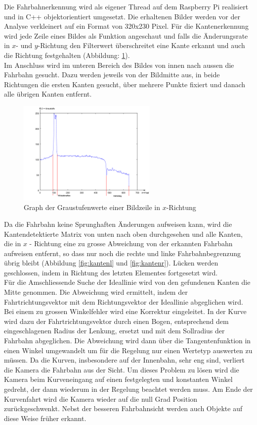 Die Fahrbahnerkennung wird als eigener Thread auf dem Raspberry Pi realisiert und in C++ objektorientiert umgesetzt. Die erhaltenen Bilder werden vor der Analyse verkleinert auf ein Format von 320x230 Pixel. Für die Kantenerkennung wird jede Zeile eines Bildes als Funktion angeschaut und falls die Änderungsrate in $x$- und $y$-Richtung den Filterwert überschreitet eine Kante erkannt und auch die Richtung festgehalten (Abbildung: \ref{fig:grayscale}).\\
Im Anschluss wird im unteren Bereich des Bildes von innen nach aussen die Fahrbahn gesucht. Dazu werden jeweils von der Bildmitte aus, in beide Richtungen die ersten Kanten gesucht, über mehrere Punkte fixiert und danach alle übrigen Kanten entfernt.
\begin{figure}[H]%
\centering
\includegraphics[width=0.6\textwidth]{03_Loesungskonzept/pictures/graphPicture.png}
\caption{Graph der Graustufenwerte einer Bildzeile in $x$-Richtung}
\label{fig:grayscale}
\end{figure}\flushleft
Da die Fahrbahn keine Sprunghaften Änderungen aufweisen kann, wird die Kantendetektierte Matrix von unten nach oben durchgesehen und alle Kanten, die in $x$ - Richtung eine zu grosse Abweichung von der erkannten Fahrbahn aufweisen entfernt, so dass nur noch die rechte und linke Fahrbahnbegrenzung übrig bleibt (Abbildung \ref{fig:kantenl} und \ref{fig:kantenr}). Lücken werden geschlossen, indem in Richtung des letzten Elementes fortgesetzt wird.\\
Für die Amschliessende Suche der Ideallinie wird von den gefundenen Kanten die Mitte genommen. Die Abweichung wird ermittelt, indem der Fahrtrichtungsvektor mit dem Richtungsvektor der Ideallinie abgeglichen wird. Bei einem zu grossen Winkelfehler wird eine Korrektur eingeleitet. In der Kurve wird dazu der Fahrtrichtungsvektor durch einen Bogen, entsprechend dem eingeschlagenen Radius der Lenkung, ersetzt und mit dem Sollradius der Fahrbahn abgeglichen. Die Abweichung wird dann über die Tangentenfunktion in einen Winkel umgewandelt um für die Regelung nur einen Wertetyp auswerten zu müssen. Da die Kurven, insbesondere auf der Innenbahn, sehr eng sind, verliert die Kamera die Fahrbahn aus der Sicht. Um dieses Problem zu lösen wird die Kamera beim Kurveneingang auf einen festgelegten und konstanten Winkel gedreht, der dann wiederum in der Regelung beachtet werden muss. Am Ende der Kurvenfahrt wird die Kamera wieder auf die null Grad Position zurückgeschwenkt. Nebst der besseren Fahrbahnsicht werden auch Objekte auf diese Weise früher erkannt.
